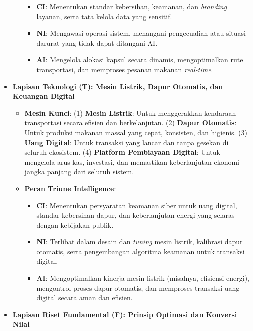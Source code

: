 \documentclass[
  letterpaper,
  DIV=11,
  numbers=noendperiod]{scrreprt}
\providecommand{\tightlist}{%
  \setlength{\itemsep}{0pt}\setlength{\parskip}{0pt}}
\begin{document}
\begin{itemize}
\begin{itemize}
    \begin{itemize}
    \tightlist
    \item
      \textbf{CI}: Menentukan standar kebersihan, keamanan, dan
      \emph{branding} layanan, serta tata kelola data yang sensitif.
    \item
      \textbf{NI}: Mengawasi operasi sistem, menangani pengecualian atau
      situasi darurat yang tidak dapat ditangani AI.
    \item
      \textbf{AI}: Mengelola alokasi kapsul secara dinamis,
      mengoptimalkan rute transportasi, dan memproses pesanan makanan
      \emph{real-time}.
    \end{itemize}
  \end{itemize}
\item
  \textbf{Lapisan Teknologi (T): Mesin Listrik, Dapur Otomatis, dan
  Keuangan Digital}

  \begin{itemize}
  \tightlist
  \item
    \textbf{Mesin Kunci}: (1) \textbf{Mesin Listrik}: Untuk menggerakkan
    kendaraan transportasi secara efisien dan berkelanjutan. (2)
    \textbf{Dapur Otomatis}: Untuk produksi makanan massal yang cepat,
    konsisten, dan higienis. (3) \textbf{Uang Digital}: Untuk transaksi
    yang lancar dan tanpa gesekan di seluruh ekosistem. (4)
    \textbf{Platform Pembiayaan Digital}: Untuk mengelola arus kas,
    investasi, dan memastikan keberlanjutan ekonomi jangka panjang dari
    seluruh sistem.
  \item
    \textbf{Peran Triune Intelligence}:

    \begin{itemize}
    \tightlist
    \item
      \textbf{CI}: Menentukan persyaratan keamanan siber untuk uang
      digital, standar kebersihan dapur, dan keberlanjutan energi yang
      selaras dengan kebijakan publik.
    \item
      \textbf{NI}: Terlibat dalam desain dan \emph{tuning} mesin
      listrik, kalibrasi dapur otomatis, serta pengembangan algoritma
      keamanan untuk transaksi digital.
    \item
      \textbf{AI}: Mengoptimalkan kinerja mesin listrik (misalnya,
      efisiensi energi), mengontrol proses dapur otomatis, dan memproses
      transaksi uang digital secara aman dan efisien.
    \end{itemize}
  \end{itemize}
\item
  \textbf{Lapisan Riset Fundamental (F): Prinsip Optimasi dan Konversi
  Nilai}


\end{itemize}
\end{document}
